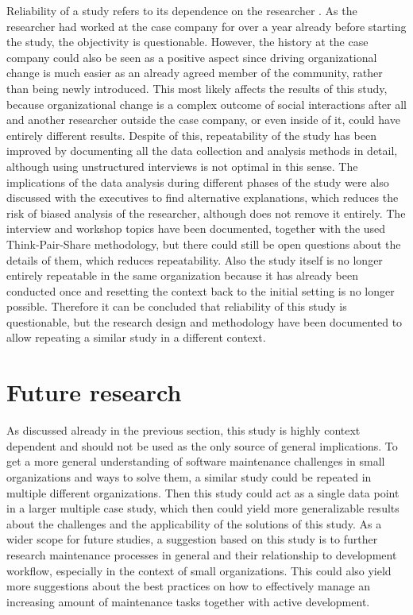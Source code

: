 Reliability of a study refers to its dependence on the researcher \citep{Runeson2012}. As the researcher had worked at the case company for over a year already before starting the study, the objectivity is
questionable. However, the history at the case company could also be seen as a positive aspect since driving organizational change is much easier as an already agreed member of the community,
rather than being newly introduced. This most likely affects the results of this study, because organizational change is a complex outcome of social interactions after all and another researcher outside
the case company, or even inside of it, could have entirely different results. Despite of this, repeatability of the study has been improved by documenting all the data collection and analysis methods
in detail, although using unstructured interviews is not optimal in this sense. The implications of the data analysis during different phases of the study were also discussed with the executives to find
alternative explanations, which reduces the risk of biased analysis of the researcher, although does not remove it entirely.
The interview and workshop topics have been documented, together with the used Think-Pair-Share methodology, but there
could still be open questions about the details of them, which reduces repeatability. Also the study itself is no longer entirely repeatable in the same organization because
it has already been conducted once and resetting the context back to the initial setting is no longer possible. Therefore it can be concluded that reliability of this study is questionable, but the research
design and methodology have been documented to allow repeating a similar study in a different context.

\section{Future research}

As discussed already in the previous section, this study is highly context dependent and should not be used as the only source of general implications. To get a more general understanding of software maintenance
challenges in small organizations and ways to solve them,
a similar study could be repeated in multiple different organizations. Then this study could act as a single data point in a larger multiple case study, which then could yield
more generalizable results about the challenges and the applicability of the solutions of this study. As a wider scope for future studies, a suggestion based on this study is to
further research maintenance processes in general and their relationship to development workflow, especially in the context of small organizations. This could also yield more suggestions about the best practices
on how to effectively manage an increasing amount of maintenance tasks together with active development.

